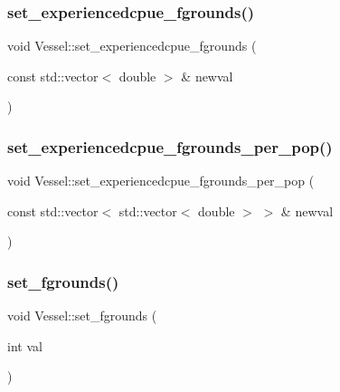 \mbox{\label{class_vessel_afa0bdfa0b54d6a9c5e453306a3824230}} 
\subsubsection{\texorpdfstring{set\_experiencedcpue\_fgrounds()}{set\_experiencedcpue\_fgrounds()}}
{\footnotesize\ttfamily void Vessel\+::set\+\_\+experiencedcpue\+\_\+fgrounds (\begin{DoxyParamCaption}\item[{const std\+::vector$<$ double $>$ \&}]{newval }\end{DoxyParamCaption})}

\mbox{\label{class_vessel_a2fc858f82e610f2b4b4852001ad0c58c}} 
\subsubsection{\texorpdfstring{set\_experiencedcpue\_fgrounds\_per\_pop()}{set\_experiencedcpue\_fgrounds\_per\_pop()}}
{\footnotesize\ttfamily void Vessel\+::set\+\_\+experiencedcpue\+\_\+fgrounds\+\_\+per\+\_\+pop (\begin{DoxyParamCaption}\item[{const std\+::vector$<$ std\+::vector$<$ double $>$ $>$ \&}]{newval }\end{DoxyParamCaption})}

\mbox{\label{class_vessel_a769d3ff8d4f77c977f630fbd0013185b}} 
\subsubsection{\texorpdfstring{set\_fgrounds()}{set\_fgrounds()}}
{\footnotesize\ttfamily void Vessel\+::set\+\_\+fgrounds (\begin{DoxyParamCaption}\item[{int}]{val }\end{DoxyParamCaption})}

